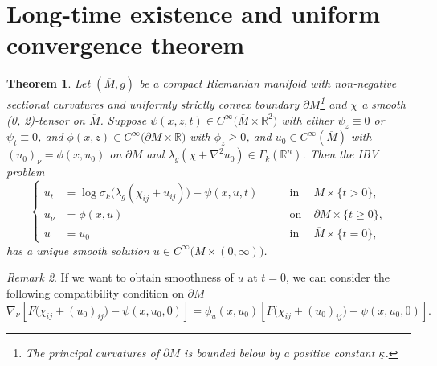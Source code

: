 \documentclass[12pt]{amsart}
\newtheorem{theorem}{Theorem}[section]
\theoremstyle{definition}
\theoremstyle{remark}
\newtheorem{remark}[theorem]{Remark}
\numberwithin{equation}{section}
\begin{document}
\section{Long-time existence and uniform convergence theorem}\label{conclusion.sec}
\begin{theorem}\label{sigma_k_long_time}
	Let $(\overline{M}, g)$ be a compact Riemanian manifold with non-negative sectional curvatures and uniformly strictly convex boundary $\partial M$\footnote{The principal curvatures of $\partial M$ is bounded below by a positive constant $\underline{\kappa}$.} and $\chi$ a smooth (0, 2)-tensor on $\overline{M}$. 
	Suppose $\psi(x, z, t) \in C^{\infty}\big( \overline{M}\times\mathbb{R}^2 \big)$ with either $\psi_z \equiv 0$ or $\psi_t \equiv 0$, and $\phi(x, z) \in C^{\infty} \big(\partial M \times \mathbb{R}\big)$ with $\phi_z \geq 0$, and $u_0 \in C^{\infty}(\overline{M})$ with $(u_0)_\nu = \phi(x, u_0)$ on $\partial M$ and $\lambda_g(\chi + \nabla^2 u_0) \in \Gamma_k(\mathbb{R}^n)$.
	Then the IBV problem
	\begin{equation}\label{eq_IBV_k-Hessian}
	\left\{
	\begin{aligned}
	u_t &= \log \sigma_k\big(\lambda_g(\chi_{ij} + u_{ij})\big) - \psi(x, u, t) \qquad &\text{in}&\; M \times \{t>0\}, \\ 
	u_\nu &= \phi(x, u) \qquad &\text{on}& \; \partial M \times \{t \geq 0\},\\
	u  &= u_0 \qquad & \text{in}& \; \overline{M}\times\{t = 0\},
	\end{aligned}
	\right.
	\end{equation}
	has a unique smooth solution $u \in C^{\infty} \big(\overline{M} \times (0, \infty) \big)$. 
\end{theorem}

\begin{remark}
	If we want to obtain smoothness of $u$ at $t = 0$, we can consider the following compatibility condition on $\partial M$
	\begin{equation}
	\nabla_\nu \left[ F\big(\chi_{ij} + (u_0)_{ij}\big) - \psi(x, u_0, 0) \right] = \phi_u(x, u_0) \left[ F\big(\chi_{ij} + (u_0)_{ij}\big) - \psi(x, u_0, 0) \right].
	\end{equation}
\end{remark}
\end{document}
